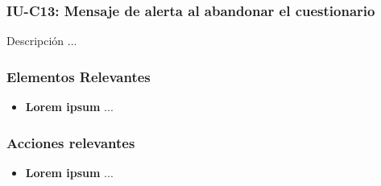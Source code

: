 
\subsubsection{IU-C13: Mensaje de alerta al abandonar el cuestionario}

 Descripción ...


\subsubsection{Elementos Relevantes}

    \begin{itemize}
    \item {\bf Lorem ipsum}
        ...
    \end{itemize}

\subsubsection{Acciones relevantes}

    \begin{itemize}
    \item {\bf Lorem ipsum}
        ...
    \end{itemize}

\clearpage
